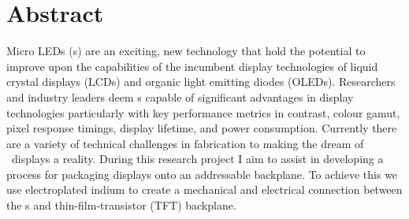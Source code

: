 
\newpage
\section*{Abstract}
Micro LEDs (\uled s) are an exciting, new technology that hold the potential to improve upon the capabilities of the incumbent display technologies of liquid crystal displays (LCDs) and organic light emitting diodes (OLEDs). Researchers and industry leaders deem \uled s capable of significant advantages in display technologies particularly with key performance metrics in contrast, colour gamut, pixel response timings, display lifetime, and power consumption.
Currently there are a variety of technical challenges in fabrication to making the dream of \uled \ displays a reality. During this research project I aim to assist in developing a process for packaging \uled  displays onto an addressable backplane.
To achieve this we use electroplated indium to create a mechanical and electrical connection between the \uled s and thin-film-transistor (TFT) backplane.
